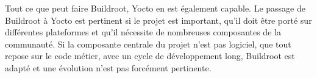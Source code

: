 Tout ce que peut faire Buildroot, Yocto en est également capable. Le passage de Buildroot à Yocto est pertinent si le projet est important, qu'il doit être porté sur différentes plateformes et qu'il nécessite de nombreuses composantes de la communauté. Si la composante centrale du projet n'est pas logiciel, que tout repose sur le code métier, avec un cycle de développement long, Buildroot est adapté et une évolution n'est pas forcément pertinente.